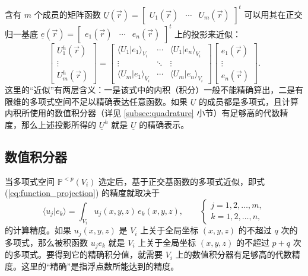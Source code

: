 \newpage{}

含有 $m$ 个成员的矩阵函数 $\underline{U}(\vec{r})=\begin{bmatrix}U_{1}(\vec{r}) & \cdots & U_{m}(\vec{r})\end{bmatrix}^{t}$
可以用其在正交归一基底 $\underline{e}(\vec{r})=\begin{bmatrix}e_{1}(\vec{r}) & \cdots & e_{n}(\vec{r})\end{bmatrix}^{t}$
上的投影来近似：
\begin{equation}
\begin{bmatrix}U_{1}^{h}(\vec{r})\\
\vdots\\
U_{m}^{h}(\vec{r})
\end{bmatrix}=\begin{bmatrix}\langle U_{1}\vert e_{1}\rangle_{V_{i}} & \cdots & \langle U_{1}\vert e_{n}\rangle_{V_{i}}\\
\vdots & \ddots & \vdots\\
\langle U_{m}\vert e_{1}\rangle_{V_{i}} & \cdots & \langle U_{m}\vert e_{n}\rangle_{V_{i}}
\end{bmatrix}\begin{bmatrix}e_{1}(\vec{r})\\
\vdots\\
e_{n}(\vec{r})
\end{bmatrix}.\label{eq:function_projection}
\end{equation}
这里的“近似”有两层含义：一是该式中的内积（积分）一般不能精确算出，二是有限维的多项式空间不足以精确表达任意函数。如果 $\underline{U}$
的成员都是多项式，且计算内积所使用的数值积分器（详见 \ref{subsec:quadrature} 小节）有足够高的代数精度，那么上述投影所得的
$\underline{U}^{h}$ 就是 $\underline{U}$ 的精确表示。

\subsection{数值积分器\label{subsec:quadrature}}

当多项式空间 $\mathbb{P}^{<p}(V_{i})$ 选定后，基于正交基函数的多项式近似，即式 (\ref{eq:function_projection})
的精度就取决于
\begin{equation}
\langle u_{j}\vert e_{k}\rangle=\int_{V_{i}}u_{j}(x,y,z)\,e_{k}(x,y,z),\qquad\begin{cases}
j=1,2,\dots,m,\\
k=1,2,\dots,n,
\end{cases}
\end{equation}
的计算精度。如果 $u_{j}(x,y,z)$ 是 $V_{i}$ 上关于全局坐标 $(x,y,z)$ 的不超过 $q$ 次的多项式，那么被积函数
$u_{j}e_{k}$ 就是 $V_{i}$ 上关于全局坐标 $(x,y,z)$ 的不超过 $p+q$ 次的多项式。要得到它的精确积分值，就需要
$V_{i}$ 上的数值积分器有足够高的代数精度。这里的“精确”是指浮点数所能达到的精度。

